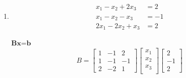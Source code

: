 \documentclass[12pt,a4paper]{report}
\begin{document}
\begin{enumerate}
\begin{enumerate}
$\textbf{Ax=b}$
\begin{equation*}
A=\begin{bmatrix}
1 & 2 & 3\\
1 & -1 & 0\\
1 & 0 & -1
\end{bmatrix}
\begin{bmatrix}
x_{1}\\
x_{2}\\
x_{3}\\
\end{bmatrix}
\begin{bmatrix}
6\\
2\\
-1
\end{bmatrix}
\end{equation*}


$\textbf{La matriz aumentada A*}$

\begin{equation*}
A*=\left [
  \begin{array}{rrr|r}
1 & 2 & 3&6\\
1 & -1 & 0& 2\\
1 & 0 & -1& -1
\end{array}
\right ]
\end{equation*}

\begin{verbatim}
> A=matrix(c(1,1,1,2,-1,0,3,0,-1),3,3)
> b<-matrix(c(6,2,-1),3,1)
> Aum<-cbind(A,b)
> R(A)
[1] 3
> R(Aum)
[1] 3
\end{verbatim}

El rango de las matrices $A$ y $A*$ es el mismo 3. $A$ es de rango completo pr lo que tiene soluciòn ùnica.
Soluciòn del sistema:
\begin{verbatim}
> sol<-solve(A,b)
> sol
           [,1]
[1,]  1.1666667
[2,] -0.8333333
[3,]  2.1666667
\end{verbatim}

\item 
\begin{align*}
x_{1}-x_{2}+2x_{3}&=2\\
x_{1}-x_{2}-x_{3}&=-1\\
2x_{1}-2x_{2}+x_{3}&=2
\end{align*}

$\textbf{Bx=b}$
\begin{equation*}
B=\begin{bmatrix}
1 & -1 & 2\\
1 & -1 & -1\\
2 & -2 & 1
\end{bmatrix}
\begin{bmatrix}
x_{1}\\
x_{2}\\
x_{3}\\
\end{bmatrix}
\begin{bmatrix}
2\\
-1\\
2
\end{bmatrix}
\end{equation*}



\end{enumerate}
\end{enumerate}
\end{document}
